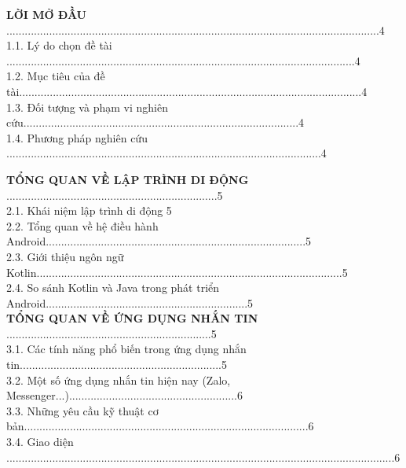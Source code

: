 \documentclass[12pt,a4paper]{article}
\begin{document}
	\vspace{1cm}
	
	\begin{flushleft}
		\textbf{LỜI MỞ ĐẦU} ..........................................................................................................................4 \\
		1.1. Lý do chọn đề tài ..................................................................................................................4\\   
		1.2. Mục tiêu của đề tài................................................................................................................4 \\
		1.3. Đối tượng và phạm vi nghiên cứu..........................................................................................4 \\
		1.4. Phương pháp nghiên cứu .......................................................................................................4
		
		\vspace{0.5cm}
		\textbf{TỔNG QUAN VỀ LẬP TRÌNH DI ĐỘNG} .....................................................................5\\
		2.1. Khái niệm lập trình di động 5\\
		2.2. Tổng quan về hệ điều hành Android.....................................................................................5 \\
		2.3. Giới thiệu ngôn ngữ Kotlin....................................................................................................5 \\
		2.4. So sánh Kotlin và Java trong phát triển Android..................................................................5 \\
		
		\vspace{0.5cm}
		\textbf{TỔNG QUAN VỀ ỨNG DỤNG NHẮN TIN} ...................................................................5\\
		3.1. Các tính năng phổ biến trong ứng dụng nhắn tin..................................................................5 \\
		3.2. Một số ứng dụng nhắn tin hiện nay (Zalo, Messenger...).......................................................6 \\
		3.3. Những yêu cầu kỹ thuật cơ bản.............................................................................................6 \\
		3.4. Giao diện ...............................................................................................................................6\\
		

\end{flushleft}
\end{document}
